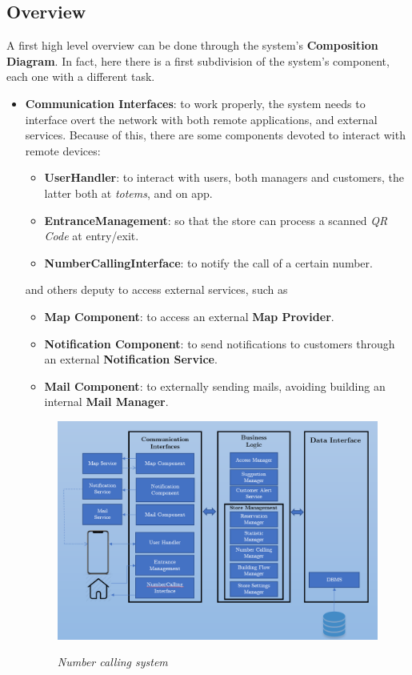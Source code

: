 \documentclass{article}
\begin{document}
	\subsection{Overview}
	A first high level overview can be done through the system's \textbf{Composition Diagram}. In fact, here there is a first subdivision of the system's component, each one with a different task.
	\begin{itemize}
		\item \textbf{Communication Interfaces}: to work properly, the system needs to interface overt the network with both remote applications, and external services. Because of this, there are some components devoted to interact with remote devices:
		\begin{itemize}
			\item{\bfseries UserHandler}: to interact with users, both managers and customers, the latter both at \emph{totems}, and on app.
			\item{\bfseries EntranceManagement}: so that the store can process a scanned \emph{QR Code} at entry/exit.
			\item{\bfseries NumberCallingInterface}: to notify the call of a certain number.
		\end{itemize}
		and others deputy to access external services, such as 
		\begin{itemize}
			\item{\bfseries Map Component}: to access an external {\bfseries Map Provider}.
			\item{\bfseries Notification Component}: to send notifications to customers through an external {\bfseries Notification Service}.
			\item{\bfseries Mail Component}: to externally sending mails, avoiding building an internal {\bfseries Mail Manager}.
		\end{itemize}
	\begin{figure}[!h]
		\begin{adjustwidth}{-0.8cm}{}
			\centering
			\includegraphics[scale=0.5]{../UML Diagrams/CompositionDiagram/CompositionDiagram.png} \\
		\end{adjustwidth}
		\caption{\emph{Number calling system}}
	\end{figure}
	

\end{itemize}
\end{document}

